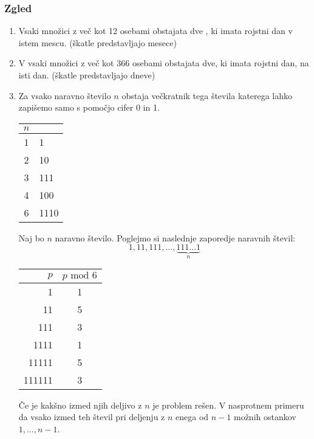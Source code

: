 \subsubsection{Zgled}
\begin{enumerate}[label=\roman*.]
    \item Vsaki množici z več kot 12 osebami obstajata dve , ki imata rojstni dan v istem mescu. (škatle predstavljajo mesece)
    \item V vsaki množici z več kot 366 osebami obstajata dve, ki imata rojstni dan, na isti dan. (škatle predstavljajo dneve)
    \item Za vsako naravno število $n$ obstaja večkratnik tega števila katerega lahko zapišemo samo s pomočjo cifer 0 in 1.
    \begin{center}
        \begin{tabular}{c|l}
            $n$ &  \\  
            \hline
            1 & 1 \\
            \hline
            2 & 10 \\ 
            \hline
            3 & 111 \\
            \hline
            4 & 100 \\
            \hline
            6 & 1110
        \end{tabular}
    \end{center}
    Naj bo $n$ naravno število. Poglejmo si naslednje zaporedje naravnih števil:
    $$
    1, 11, 111, \dots, \underset{n}{\underbrace{111\ldots 1}}
    $$
    \begin{center}
        \begin{tabular}{r|c}
            $p$ & $p \text{ mod } 6$ \\  
            \hline
            1 & 1 \\
            \hline
            11 & 5 \\ 
            \hline
            111 & 3 \\
            \hline
            1111 & 1 \\
            \hline
            11111 & 5 \\
            \hline
            111111 & 3 \\
        \end{tabular}
    \end{center}
    Če je kakšno izmed njih deljivo z $n$ je problem rešen. V nasprotnem primeru da vsako izmed teh števil pri deljenju z $n$ enega od $n - 1$ možnih ostankov $1, \dots, n - 1$. \\

\end{enumerate}
